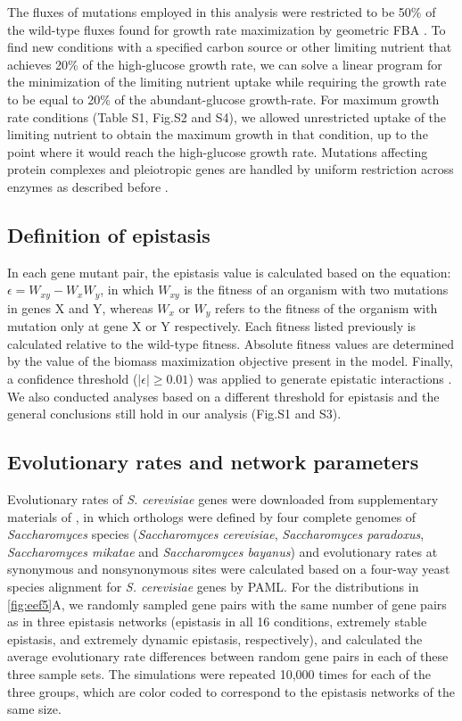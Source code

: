 \documentclass[10pt]{article}
\newcommand{\Figs}{Fig.} %
\newcommand{\citep}{\cite}
\newcommand{\citet}{\citep}
\begin{document}
The fluxes of mutations employed in this analysis were restricted to
be 50\% of the wild-type fluxes found for growth rate maximization by
geometric FBA \citep{He2010}. To find new conditions with a specified carbon
source or other limiting nutrient that achieves 20\% of the
high-glucose growth rate, we can solve a linear program for the
minimization of the limiting nutrient uptake while requiring the
growth rate to be equal to 20\% of the abundant-glucose
growth-rate. For maximum growth rate conditions (Table S1, \Figs S2
and S4), we allowed unrestricted uptake of the limiting nutrient to
obtain the maximum growth in that condition, up to the point where it
would reach the high-glucose growth rate. Mutations affecting protein
complexes and pleiotropic genes are handled by uniform restriction
across enzymes as described before \citep{Xu2012}.

\subsection*{Definition of epistasis}

In each gene mutant pair, the epistasis value is calculated based on
the equation: $\epsilon = W_{xy} - W_xW_y$, in which $W_{xy}$ is the
fitness of an organism with two mutations in genes X and Y, whereas
$W_{x}$ or $W_{y}$ refers to the fitness of the organism with mutation
only at gene X or Y respectively. Each fitness listed previously is
calculated relative to the wild-type fitness. Absolute fitness values
are determined by the value of the biomass maximization objective
present in the model. Finally, a confidence threshold
($\left|\epsilon\right| \geq 0.01$) was applied to generate epistatic
interactions \citep{Xu2012, Costanzo2010, He2010}. We also conducted
analyses based on a different threshold for epistasis and the general
conclusions still hold in our analysis (\Figs S1 and S3).

\subsection*{Evolutionary rates and network parameters}

Evolutionary rates of \textit{S. cerevisiae} genes were downloaded
from supplementary materials of \citet{Wall2005}, in which orthologs were
defined by four complete genomes of \textit{Saccharomyces} species
(\textit{Saccharomyces cerevisiae}, \textit{Saccharomyces paradoxus},
\textit{Saccharomyces mikatae} and \textit{Saccharomyces bayanus}) and
evolutionary rates at synonymous and nonsynonymous sites were
calculated based on a four-way yeast species alignment for
\textit{S. cerevisiae} genes by PAML. For the distributions in
\ref{fig:eef5}A, we randomly sampled gene pairs with the same number
of gene pairs
as in three epistasis networks (epistasis in all 16 conditions,
extremely stable epistasis, and extremely dynamic epistasis,
respectively), and calculated the average evolutionary rate
differences between random gene pairs in each of these three sample
sets. The simulations were repeated 10,000 times for each of the three
groups, which are color coded to correspond to the epistasis networks
of the same size.
\end{document}

